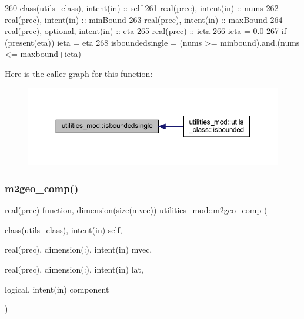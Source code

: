 \begin{DoxyCode}
260     \textcolor{keywordtype}{class}(utils\_class), \textcolor{keywordtype}{intent(in)} :: self
261     \textcolor{keywordtype}{real(prec)}, \textcolor{keywordtype}{intent(in)} :: nums
262     \textcolor{keywordtype}{real(prec)}, \textcolor{keywordtype}{intent(in)} :: minBound
263     \textcolor{keywordtype}{real(prec)}, \textcolor{keywordtype}{intent(in)} :: maxBound
264     \textcolor{keywordtype}{real(prec)}, \textcolor{keywordtype}{optional}, \textcolor{keywordtype}{intent(in)} :: eta
265     \textcolor{keywordtype}{real(prec)} :: ieta
266     ieta = 0.0
267     \textcolor{keywordflow}{if} (\textcolor{keyword}{present}(eta)) ieta = eta
268     isboundedsingle = (nums >= minbound).and.(nums <= maxbound+ieta)
\end{DoxyCode}
Here is the caller graph for this function\+:\nopagebreak
\begin{figure}[H]
\begin{center}
\leavevmode
\includegraphics[width=350pt]{namespaceutilities__mod_a258d85bcc477041275bd954667168ea3_icgraph}
\end{center}
\end{figure}
\mbox{\label{namespaceutilities__mod_ae6b8a45b229e3f1f8c2b12dd74e7a2dd}} 
\subsubsection{\texorpdfstring{m2geo\+\_\+comp()}{m2geo\_comp()}}
{\footnotesize\ttfamily real(prec) function, dimension(size(mvec)) utilities\+\_\+mod\+::m2geo\+\_\+comp (\begin{DoxyParamCaption}\item[{class(\mbox{\hyperlink{structutilities__mod_1_1utils__class}{utils\+\_\+class}}), intent(in)}]{self,  }\item[{real(prec), dimension(\+:), intent(in)}]{mvec,  }\item[{real(prec), dimension(\+:), intent(in)}]{lat,  }\item[{logical, intent(in)}]{component }\end{DoxyParamCaption})\hspace{0.3cm}{\ttfamily [private]}}



